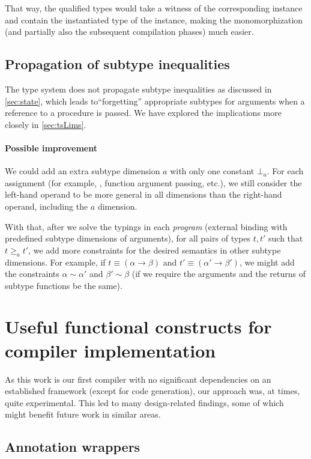 That way, the qualified types would take a witness of the corresponding instance and contain the instantiated type of the instance, making the monomorphization (and partially also the subsequent compilation phases) much easier.

\subsection{Propagation of subtype inequalities}
\label{sec:weakness}

The type system does not propagate subtype inequalities as discussed in \cref{sec:state}, which leads to``forgetting'' appropriate subtypes for arguments when a reference to a procedure is passed. We have explored the implications more closely in \cref{sec:tsLims}.

\paragraph{Possible improvement}
We could add an extra subtype dimension $a$ with only one constant $\bot_a$. For each assignment (for example, , function argument passing, etc.), we still consider the left-hand operand to be more general in all dimensions than the right-hand operand, including the $a$ dimension.

With that, after we solve the typings in each \emph{program} (external binding with predefined subtype dimensions of arguments), for all pairs of types $t, t'$ such that $t \geq_a t'$, we add more constraints for the desired semantics in other subtype dimensions. For example, if $t \equiv (\alpha \to \beta)$ and $t' \equiv (\alpha' \to \beta')$, we might add the constraints $\alpha \sim \alpha'$ and $\beta' \sim \beta$ (if we require the arguments and the returns of subtype functions be the same).

\section{Useful functional constructs for compiler implementation}

As this work is our first compiler with no significant dependencies on an established framework (except for code generation), our approach was, at times, quite experimental. This led to many design-related findings, some of which might benefit future work in similar areas.

\subsection{Annotation wrappers}
\label{sec:annotations}

